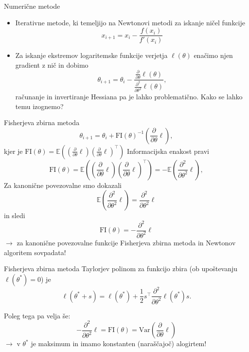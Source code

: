 \documentclass[10pt]{beamer}
\begin{document}
\begin{frame}{Numerične metode}
    \begin{itemize}
        \item 
        Iterativne metode, ki temeljijo na Newtonovi metodi za iskanje ničel funkcije
        \[
            x_{i+1} = x_{i} - \frac{f(x_{i})}{f'(x_{i})}
        \]
        \pause
        \item Za iskanje ekstremov logaritemske funkcije verjetja $\ell(\theta)$ enačimo njen gradient z nič in dobimo
        \[
            \theta_{i+1} = \theta_{i} - \frac{\frac{\partial}{\partial\theta}\ell(\theta)}{\frac{\partial^2}{\partial\theta^2}\ell(\theta)},
        \]
        računanje in invertiranje Hessiana pa je lahko problematično. Kako se lahko temu izognemo?
    \end{itemize}
    
\end{frame}

\begin{frame}{Fisherjeva zbirna metoda}
\[
    \theta_{i+1} = \theta_{i} + \mathrm{FI}(\theta)^{-1}\left(\frac{\partial}{\partial\theta}\ell\right),
\]
kjer je $\mathrm{FI}(\theta) = \mathbb{E}\left((\frac{\partial}{\partial\theta}\ell)(\frac{\partial}{\partial\theta}\ell)^\top\right)$
\pause
Informacijska enakost pravi
\begin{equation*}
    \mathrm{FI}(\theta) = \mathbb{E}\left((\frac{\partial}{\partial\theta} \ell)(\frac{\partial}{\partial\theta} \ell)^\top\right) = -\mathbb{E}\left(\frac{\partial^2}{\partial\theta^2}\ell\right),
\end{equation*}
\pause
Za kanonične povezovalne smo dokazali
\[
    \mathbb{E}\left(\frac{\partial^2}{\partial\theta^2}\ell\right) = \frac{\partial^2}{\partial\theta^2}\ell
\]
in sledi
\[
    \mathrm{FI}(\theta) = -\frac{\partial^2}{\partial\theta^2}\ell
\]
\pause
$\rightarrow$ za kanonične povezovalne funkcije Fisherjeva zbirna metoda in Newtonov algoritem sovpadata!
\end{frame}

\begin{frame}{Fisherjeva zbirna metoda}
Taylorjev polinom za funkcijo zbira (ob upoštevanju $\ell(\theta^{*}) = 0$) je
\[
    \ell(\theta^{*} + s) = \ell(\theta^{*}) + \frac{1}{2}s^\top \frac{\partial^2}{\partial\theta^2}\ell(\theta^{*})s.
\]

Poleg tega pa velja še:
\[
    -\frac{\partial^2}{\partial\theta^2}\ell = \mathrm{FI}(\theta) = \mathrm{Var}\left(\frac{\partial}{\partial\theta}\ell\right)
\]
\pause
$\rightarrow$ v $\theta^{*}$ je maksimum in imamo konstanten (naraščajoč) alogirtem!
\end{frame}
\end{document}
